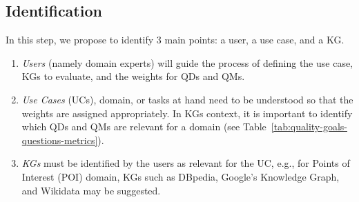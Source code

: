 \documentclass[runningheads]{llncs}
\begin{document}
\subsection{Identification}
\label{subsec:identification}
In this step, we propose to identify 3 main points: a user, a use case, and a KG.
\begin{enumerate}
    \item[i.] \textit{Users} (namely domain experts) will guide the process of defining the use case, KGs to evaluate, and the weights for QDs and QMs.
    \item[ii.] \textit{Use Cases} (UCs), domain, or tasks at hand need to be understood so that the weights are assigned appropriately. In KGs context, it is important to identify which QDs and QMs are relevant for a domain (see Table~\ref{tab:quality-goals-questions-metrics}).
    \item[iii.] \textit{KGs} must be identified by the users as relevant for the UC, e.g., for Points of Interest (POI) domain, KGs such as DBpedia, Google's Knowledge Graph, and Wikidata may be suggested.
\end{enumerate}




%
\end{document}
